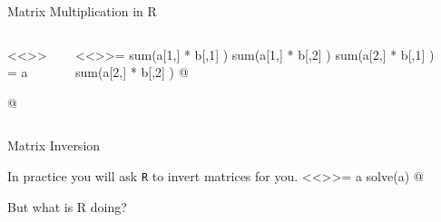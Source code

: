\documentclass[11pt]{beamer}
\begin{document}
\begin{frame}[fragile]{Matrix Multiplication in R}
\footnotesize

\begin{columns}
\begin{column}{0.45\textwidth}
<<>>=
a %

@
\end{column}

\vrule{}

\begin{column}{0.45\textwidth}
<<>>=
sum(a[1,] * b[,1] )
sum(a[1,] * b[,2] )
sum(a[2,] * b[,1] )
sum(a[2,] * b[,2] )
@


\end{column}
\end{columns}
\end{frame}


\begin{frame}[fragile]{Matrix Inversion}

In practice you will ask \texttt{R} to invert matrices for you. 
\footnotesize
<<>>=
a
solve(a)
@
\normalsize

But what is R doing?

\end{frame}
\end{document}

